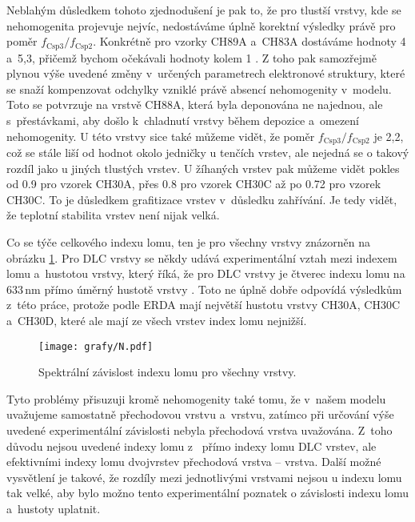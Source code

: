 Neblahým důsledkem tohoto zjednodušení je pak to, že pro tlustší vrstvy, kde se nehomogenita projevuje nejvíc, nedostáváme úplně korektní výsledky právě pro poměr $f_\mathrm{Csp3}/f_\mathrm{Csp2}$. Konkrétně pro vzorky CH89A a~CH83A dostáváme hodnoty 4 a~5,3, přičemž bychom očekávali hodnoty kolem 1 \cite{Robertson2002}. 
Z toho pak samozřejmě plynou výše uvedené změny v~určených parametrech elektronové struktury, které se snaží kompenzovat odchylky vzniklé právě absencí nehomogenity v~modelu. Toto se potvrzuje na vrstvě CH88A, která byla deponována ne najednou, ale s~přestávkami, aby došlo k~chladnutí vrstvy během depo\-zi\-ce a~omezení nehomogenity. 
U této vrstvy sice také můžeme vidět, že poměr $f_\mathrm{Csp3}/f_\mathrm{Csp2}$ je 2,2, což se stále liší od hodnot okolo jedničky u tenčích vrstev, ale nejedná se o takový rozdíl jako u jiných tlustých vrstev. 
U žíhaných vrstev pak můžeme vidět pokles od 0.9 pro vzorek CH30A, přes 0.8 pro vzorek CH30C až po 0.72 pro vzorek CH30C. To je důsledkem grafitizace vrstev v~důsledku zahřívání. Je tedy vidět, že teplotní stabilita vrstev není nijak velká. 

Co se týče celkového indexu lomu, ten je pro všechny vrstvy znázorněn na obrázku \ref{index}. Pro DLC vrstvy se někdy udává experimentální vztah mezi indexem lomu a~hustotou vrstvy, který říká, že pro DLC vrstvy je čtverec indexu lomu na 633\,nm přímo úměrný hustotě vrstvy \cite{Donnet2008}. Toto ne úplně dobře odpovídá výsledkům z~této práce, protože podle ERDA mají největší hustotu vrstvy CH30A, CH30C a~CH30D, které ale mají ze všech vrstev index lomu nejnižší. 

\begin{figure}[tbhp]
	\texttt{[image: grafy/N.pdf]}
	\caption{Spektrální závislost indexu lomu pro všechny vrstvy.} 
	\label{index}
\end{figure}

Tyto problémy přisuzuji kromě nehomogenity také tomu, že v~našem modelu uvažujeme samostatně přechodovou vrstvu a~vrstvu, zatímco při určování výše uvedené experimentální závislosti nebyla přechodová vrstva uvažována. Z~toho důvodu nejsou uvedené indexy lomu z~\cite{Donnet2008} přímo indexy lomu DLC vrstev, ale efektivními indexy lomu dvojvrstev přechodová vrstva -- vrstva. Další možné vysvětlení je takové, že rozdíly mezi jednotlivými vrstvami nejsou u indexu lomu tak velké, aby bylo možno tento experimentální poznatek o závislosti indexu lomu a~hustoty uplatnit. 

